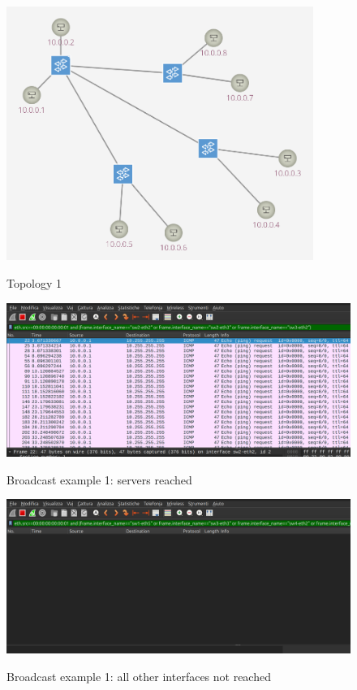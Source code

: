 \documentclass{article}
\begin{document}
\begin{figure}[H]
    \includegraphics[width=10cm, center]{images/1-topo.png}
    \label{fig:1topo}
    \caption{Topology 1}
\end{figure}


\begin{figure}[H]
    \includegraphics[width=12cm, center]{images/1-reached.png}
    \label{fig:1reac}
    \caption{Broadcast example 1: servers reached}
\end{figure}

\begin{figure}[H]
    \includegraphics[width=12cm, center]{images/1-unreached.png}
    \label{fig:1unreac}
    \caption{Broadcast example 1: all other interfaces not reached}
\end{figure}
\end{document}
